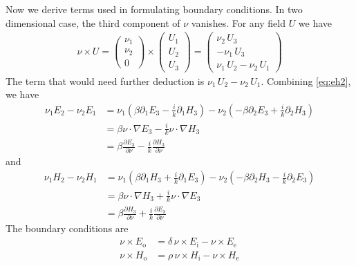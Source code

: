 Now we derive terms used in formulating boundary conditions. In two dimensional case, the third component of $\nu$ vanishes. For any field $U$ we have 
\begin{equation}
\begin{split}
  \nu\times U = \begin{pmatrix}\nu_1 \\ \nu_2 \\ 0\end{pmatrix} 
    \times 
    \begin{pmatrix}U_1\\U_2\\U_3\end{pmatrix} =
      \begin{pmatrix}\nu_2\,U_3\\-\nu_1\,U_3\\ \nu_1\,U_2-\nu_2\,U_1\end{pmatrix}
\end{split}
\end{equation}
The term that would need further deduction is $\nu_1\,U_2-\nu_2\,U_1$. Combining \eqref{eq:eh2}, we have
\begin{equation}\label{eq:nuE}
\begin{split}
  \nu_1 E_2 - \nu_2 E_1 &= \nu_1\left(\beta\partial_1 E_3 - \frac{i}{k}\partial_1 H_3\right) - \nu_2\left(-\beta\partial_2 E_3 + \frac{i}{k}\partial_2 H_3\right) \\
  &= \beta\nu\cdot\nabla E_3 - \frac{i}{k}\nu\cdot\nabla H_3\\
  &= \beta\frac{\partial E_3}{\partial\nu} - \frac{i}{k}\frac{\partial H_3}{\partial\nu}
\end{split}
\end{equation}
and
\begin{equation}\label{eq:nuH}
\begin{split}
  \nu_1 H_2 - \nu_2 H_1 &= \nu_1\left(\beta\partial_1 H_3 + \frac{i}{k}\partial_1 E_3\right) - \nu_2\left(-\beta\partial_2 H_3 - \frac{i}{k}\partial_2 E_3\right) \\
  &= \beta\nu\cdot\nabla H_3 + \frac{i}{k}\nu\cdot\nabla E_3\\
  &= \beta\frac{\partial H_3}{\partial\nu} + \frac{i}{k}\frac{\partial E_3}{\partial\nu}
\end{split}
\end{equation}
The boundary conditions are
\begin{align}
  \nu\times E_\text{o} &= \delta\,\nu\times E_\text{i} - \nu\times E_\text{e}\label{eq:bc00}\\
  \nu\times H_\text{o} &= \rho\,\nu\times H_\text{i} - \nu\times H_\text{e}\label{eq:bc01}
\end{align}
